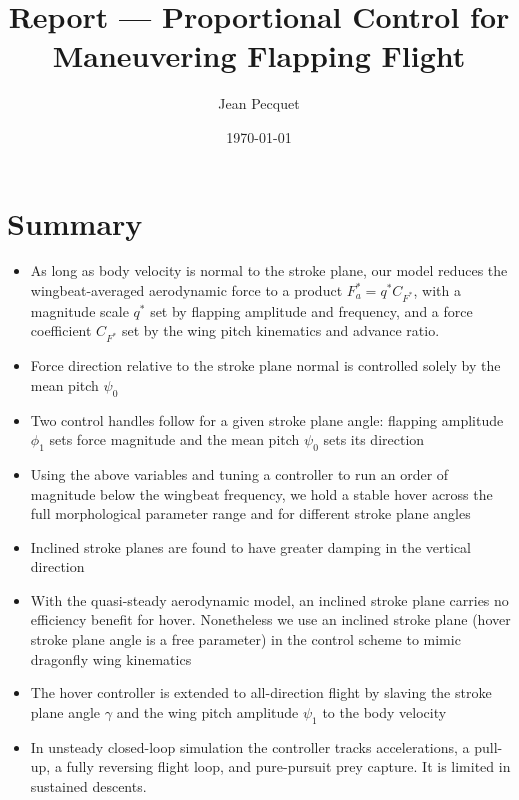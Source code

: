 \documentclass[11pt,letterpaper]{article}
\title{Report --- Proportional Control for Maneuvering Flapping Flight}
\author{Jean Pecquet}
\date{\today}
\begin{document}
\maketitle
\tableofcontents

\newpage

\section{Summary}%
\label{sec:intro}

\begin{itemize}
    \item As long as body velocity is normal to the stroke plane, our model reduces the
    wingbeat-averaged aerodynamic force to a product $F_a^* = q^* C_{F^*}$, with a
    magnitude scale $q^*$ set by flapping amplitude and frequency, and a force
    coefficient $C_{F^*}$ set by the wing pitch kinematics and advance ratio.
    \item Force direction relative to the stroke plane normal is controlled
        solely by the mean pitch $\psi_0$
    \item Two control handles follow for a given stroke plane angle: flapping
        amplitude $\phi_1$ sets force magnitude and the mean pitch $\psi_0$ sets its direction
    \item Using the above variables and tuning a controller to run an order
        of magnitude below the wingbeat frequency, we hold a stable hover across
        the full morphological parameter range and for different stroke plane angles
    \item Inclined stroke planes are found to have greater damping in the
        vertical direction
    \item With the quasi-steady aerodynamic model, an inclined stroke plane carries no
    efficiency benefit for hover. Nonetheless we use an inclined stroke plane
    (hover stroke plane angle is a free parameter) in the control scheme to mimic
    dragonfly wing kinematics
    \item The hover controller is extended to all-direction flight by slaving
        the stroke plane angle $\gamma$ and the wing pitch amplitude $\psi_1$
        to the body velocity
    \item In unsteady closed-loop simulation the controller tracks accelerations, a
    pull-up, a fully reversing flight loop, and pure-pursuit prey capture. It is limited
    in sustained descents.
\end{itemize}
\end{document}
